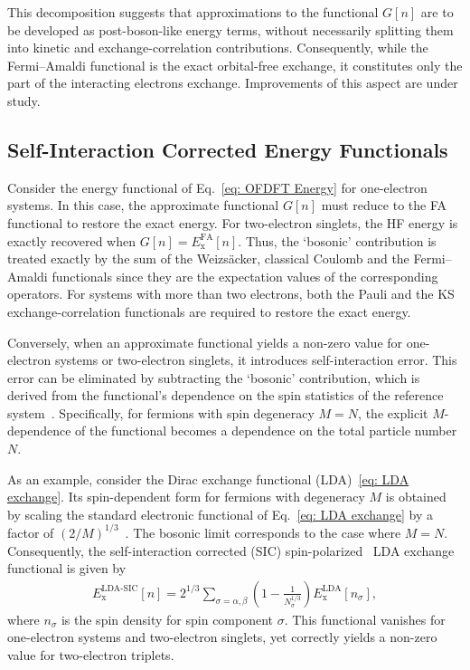 \documentclass[%
 reprint,
 amsmath,amssymb,
 aps,
pra,
]{revtex4-2}
\begin{document}
This decomposition suggests that approximations to the functional $G[n]$ are to be developed as post-boson-like energy terms, without necessarily splitting them into kinetic and exchange-correlation contributions. Consequently, while the Fermi--Amaldi functional is the exact orbital-free exchange, it constitutes only the part of the interacting electrons exchange. Improvements of this aspect are under study.

\subsection{Self-Interaction Corrected Energy Functionals}

Consider the energy functional of Eq.~\eqref{eq: OFDFT Energy} for one-electron systems. In this case, the approximate functional $G[n]$ must reduce to the FA functional to restore the exact energy. For two-electron singlets, the HF energy is exactly recovered when $G[n]=E_{\text{x}}^{\text{FA}}[n]$. Thus, the `bosonic' contribution is treated exactly by the sum of the Weizsäcker, classical Coulomb and the Fermi--Amaldi functionals since they are the expectation values of the corresponding operators. For systems with more than two electrons, both the Pauli and the KS exchange-correlation functionals are required to restore the exact energy. 

Conversely, when an approximate functional yields a non-zero value for one-electron systems or two-electron singlets, it introduces self-interaction error. This error can be eliminated by subtracting the `bosonic' contribution, which is derived from the functional's dependence on the spin statistics of the reference system~\cite{Bosko.2023.PRA.108.052803}. Specifically, for fermions with spin degeneracy $M=N$, the explicit $M$-dependence of the functional becomes a dependence on the total particle number $N$.

As an example, consider the Dirac exchange functional (LDA)~\eqref{eq: LDA exchange}. Its spin-dependent form for fermions with degeneracy $M$ is obtained by scaling the standard electronic functional of Eq.~\eqref{eq: LDA exchange} by a factor of $(2/M)^{1/3}$~\cite{Bosko.2023.PRA.108.052803}. The bosonic limit corresponds to the case where $M=N$. Consequently, the self-interaction corrected (SIC) spin-polarized~\cite{Oliver.1979.PRA.20.397,Bosko.2023.PRA.108.052803} LDA exchange functional is given by
\begin{gather}\label{eq: LDA-SIC}
    E^{\text{LDA-SIC}}_{\text{x}}[n]
    =
    2^{1/3}
    \sum_{\sigma=\alpha,\beta}
    \left(
        1 - \frac{1}{N_{\sigma}^{1/3}}
    \right)
    E^{\text{LDA}}_{\text{x}}[n_{\sigma}],
\end{gather}
where $n_{\sigma}$ is the spin density for spin component $\sigma$. This functional vanishes for one-electron systems and two-electron singlets, yet correctly yields a non-zero value for two-electron triplets.
\end{document}

